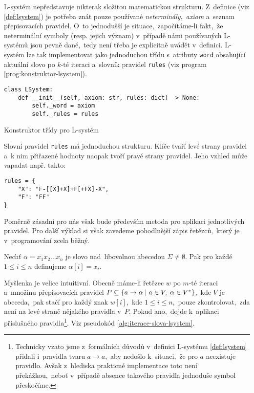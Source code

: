 L-systém nepředstavuje nikterak složitou matematickou strukturu. Z~definice (viz \ref{def:lsystem}) je potřeba znát pouze používané \emph{neterminály},~\emph{axiom} a~seznam přepisovacích pravidel. O~to jednodušší je situace,~započítáme-li fakt,~že neterminální symboly (resp. jejich význam) v~případě námi používaných L-systémů jsou pevně dané,~tedy není třeba je explicitně uvádět v~definici. L-systém lze tak implementovat jako jednoduchou třídu s~atributy \texttt{word} obsahující aktuální slovo po $k$-té iteraci a~slovník pravidel \texttt{rules} (viz program \ref{prog:konstruktor-lsystem}).
\begin{program}[h]
    \begin{lstlisting}[style=python]
class LSystem:
    def __init__(self, axiom: str, rules: dict) -> None:
        self._word = axiom
        self._rules = rules
\end{lstlisting}
    \caption{Konstruktor třídy pro L-systém}
    \label{prog:konstruktor-lsystem}
\end{program}
Slovní pravidel \texttt{rules} má jednoduchou strukturu. Klíče tvaří levé strany pravidel a~k nim přiřazené hodnoty naopak tvoří pravé strany pravidel. Jeho vzhled může vapadat např. takto:
\begin{verbatim}
rules = {
    "X": "F-[[X]+X]+F[+FX]-X",
    "F": "FF"
}
\end{verbatim}
Poměrně zásadní pro nás však bude především metoda pro aplikaci jednotlivých pravidel. Pro další výklad si však zavedeme pohodlnější zápis řetězců,~který je v~programování zcela běžný.
\begin{definition}\label{def:index-retezce}
    Nechť $\alpha=x_1x_2\ldots x_n$ je slovo nad~libovolnou abecedou $\Sigma\neq\emptyset$. Pak pro každé $1\leqslant i\leqslant n$ definujeme $\alpha[i]=x_i$.
\end{definition}
Myšlenka je velice intuitivní. Obecně máme-li řetězec $w$ po $m$-té iteraci a~množinu přepisovacích pravidel $P\subseteq\left\{a\to\alpha\mid a\in V,\;\alpha\in V^*\right\}$,~kde $V$ je abeceda,~pak stačí pro každý znak $w[i]$,~kde $1\leqslant i\leqslant n$,~pouze zkontrolovat,~zda není na levé straně nějakého pravidla v~$P$. Pokud ano,~dojde k~aplikaci příslušného pravidla\footnote{Technicky vzato jsme z~formálních důvodů v~definici L-systému \ref{def:lsystem} přidali i~pravidla tvaru $a\to a$,~aby nedošlo k~situaci,~že pro $a$ neexistuje pravidlo. Avšak z~hlediska prakticné implementace toto není překážkou,~neboť v~případě absence takového pravidla jednoduše symbol přeskočíme.}. Viz pseudokód \ref{alg:iterace-slova-lsystem}.
